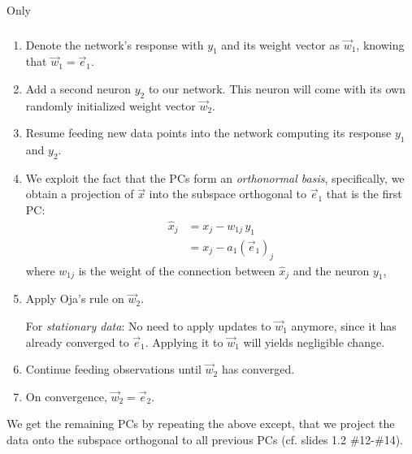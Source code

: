 \begin{frame}{Only}\frametitle{\secname}
\begin{enumerate}
\item<only@1-3> Denote the network's response with $y_1$ and its weight vector as $\vec w_1$, knowing that $\vec w_1 = \vec e_1$.
\item<only@1-3> Add a second neuron $y_2$ to our network. This neuron will come with its own randomly initialized weight vector $\vec w_2$.
\item<only@1-3,4> Resume feeding new data points into the network computing its response $y_1$ and $y_2$.
\item<only@4,5> We exploit the fact that the PCs form an \emph{orthonormal basis}, specifically, we obtain a projection of $\vec x$ 
into the subspace orthogonal to $\vec e_1$ that is the first PC:
\begin{align}
\hat x_j &= x_j - w_{1j} \, y_1 \\
         &= x_j - a_1 (\vec e_1)_j
\end{align}
where $w_{1j}$ is the weight of the connection between $\hat x_j$ and the neuron $y_1$,
\item<only@4-> Apply Oja's rule on $\vec w_2$.

For \emph{stationary data}: No need to apply updates to $\vec w_1$ anymore, since it has already converged to $\vec e_1$. Applying it to $\vec w_1$ will yields negligible change.
 
\item<only@4-> Continue feeding observations until $\vec w_2$ has converged.
\item<only@4-> On convergence, $\vec w_2 = \vec e_2$.
\end{enumerate}

\end{frame}

\begin{frame}

We get the remaining PCs by repeating the above except, that we project 
the data onto the subspace orthogonal to all previous PCs (cf. slides 1.2 \#12-\#14).

\end{frame}

